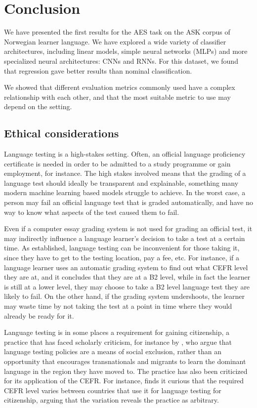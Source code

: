 \chapter{Conclusion} \label{ch:conclusion}

We have presented the first results for the \ac{AES} task on the ASK corpus
of Norwegian learner language. We have explored a wide variety of classifier
architectures, including linear models, simple neural networks (\acp{MLP})
and more specialized neural architectures: \acp{CNN} and \acp{RNN}. For this
dataset, we found that regression gave better results than nominal
classification.

We showed that different evaluation metrics commonly used have a complex
relationship with each other, and that the most suitable metric to use may
depend on the setting.


\section{Ethical considerations}

Language testing is a high-stakes setting. Often, an official language
proficiency certificate is needed in order to be admitted to a study
programme or gain employment, for instance. The high stakes involved means
that the grading of a language test should ideally be transparent and
explainable, something many modern machine learning based models struggle to
achieve. In the worst case, a person may fail an official language test that
is graded automatically, and have no way to know what aspects of the test
caused them to fail.

Even if a computer essay grading system is not used for grading an official
test, it may indirectly influence a language learner's decision to take a
test at a certain time. As established, language testing can be inconvenient
for those taking it, since they have to get to the testing location, pay a
fee, etc. For instance, if a language learner uses an automatic grading
system to find out what CEFR level they are at, and it concludes that they
are at a B2 level, while in fact the learner is still at a lower level, they
may choose to take a B2 level language test they are likely to fail. On the
other hand, if the grading system undershoots, the learner may waste time by
not taking the test at a point in time where they would already be ready for
it.

Language testing is in some places a requirement for gaining citizenship, a
practice that has faced scholarly criticism, for instance by
\textcite[162]{weberhorner}, who argue that language testing policies are a
means of social exclusion, rather than an opportunity that encourages
transnationals and migrants to learn the dominant language in the region they
have moved to. The practice has also been criticized for its application of
the \ac{CEFR}. For instance, \textcite{van2009fortress} finds it curious that
the required CEFR level varies between countries that use it for language
testing for citizenship, arguing that the variation reveals the practice as
arbitrary.

